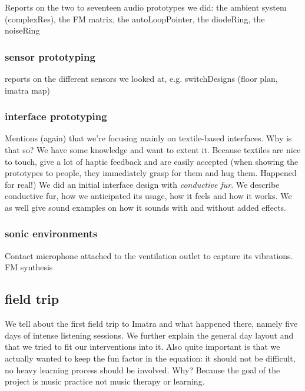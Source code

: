 \documentclass{chi-ext}
\begin{document}
\begin{multicols}{2}
Reports on the two to seventeen audio prototypes we did: 
the ambient system (complexRes), the FM matrix, the autoLoopPointer, the diodeRing, the noiseRing

\subsubsection{sensor prototyping}
\label{sub:sensor_prototyping}
reports on the different sensors we looked at, e.g. switchDesigns (floor plan, imatra map)


\subsubsection{interface prototyping}
\label{ssub:interface_prototyping}

Mentions (again) that we're focusing mainly on textile-based interfaces.
Why is that so? 
	We have some knowledge and want to extent it. 
	Because textiles are nice to touch, give a lot of haptic feedback and are easily accepted (when showing the prototypes to people, they immediately grasp for them and hug them. Happened for real!)
We did an initial interface design with \emph{conductive fur}. 
We describe conductive fur, how we anticipated its usage, how it feels and how it works.
We as well give sound examples on how it sounds with and without added effects.

\subsubsection{sonic environments}
\label{ssub:sonic_environments}

Contact microphone attached to the ventilation outlet to capture its vibrations.
FM synthesis

\subsection{field trip}
\label{sub:field_trip}

We tell about the first field trip to Imatra and what happened there, namely five days of intense listening sessions.
We further explain the general day layout and that we tried to fit our interventions into it.
Also quite important is that we actually wanted to keep the fun factor in the equation: it should not be difficult, no heavy learning process should be involved. Why? Because the goal of the project is music practice not music therapy or learning.


\end{multicols}
\end{document}
